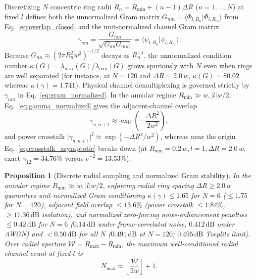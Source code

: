 \documentclass[aps,pra,onecolumn,notitlepage,11pt,tightenlines,amsmath,amssymb,floatfix,longbibliography]{revtex4-2}
\providecommand{\braket}[2]{\langle#1\vert#2\rangle}
\providecommand{\abs}[1]{\lvert#1\rvert}
\newtheorem{proposition}{Proposition}
\begin{document}
Discretizing $N$ concentric ring radii $R_n = R_{\min} + (n-1)\Delta R$ ($n = 1,\dots,N$) at fixed $l$ defines both the unnormalized Gram matrix $G_{nm} = \braket{\Phi_{l,R_n}}{\Phi_{l,R_m}}$ from Eq.~\eqref{eq:overlap_closed} and the unit-normalized channel Gram matrix
\begin{equation}
\gamma_{nm} = \frac{G_{nm}}{\sqrt{G_{nn} G_{mm}}} = \braket{\psi_{l,R_n}}{\psi_{l,R_m}}.
\label{eq:gram_normalized}
\end{equation}
Because $G_{nn} \approx (2\pi R_n^2 w^2)^{-1/2}$ decays as $R_n^{-1}$, the unnormalized condition number $\kappa(G) = \lambda_{\max}(G)/\lambda_{\min}(G)$ grows spuriously with $N$ even when rings are well separated (for instance, at $N = 120$ and $\Delta R = 2.0\,w$, $\kappa(G) = 80.02$ whereas $\kappa(\gamma) = 1.741$). Physical channel demultiplexing is governed strictly by $\gamma_{nm}$ in Eq.~\eqref{eq:gram_normalized}. In the annular regime $R_{\min} \gg w, \abs{l}w/2$, Eq.~\eqref{eq:gamma_normalized} gives the adjacent-channel overlap
\begin{equation}
\gamma_{n,n+1} \approx \exp\!\left(-\frac{\Delta R^2}{2w^2}\right),
\label{eq:crosstalk_asymptotic}
\end{equation}
and power crosstalk $\abs{\gamma_{n,n+1}}^2 \approx \exp(-\Delta R^2/w^2)$, whereas near the origin Eq.~\eqref{eq:crosstalk_asymptotic} breaks down (at $R_{\min} = 0.2\,w, l = 1, \Delta R = 2.0\,w$, exact $\gamma_{12} = 34.76\%$ versus $e^{-2} = 13.53\%$).

\begin{proposition}[Discrete radial sampling and normalized Gram stability]
\label{prop:channel_capacity}
In the annular regime $R_{\min} \gg w, \abs{l}w/2$, enforcing radial ring spacing $\Delta R \ge 2.0\,w$ guarantees unit-normalized Gram conditioning $\kappa(\gamma) \le 1.65$ for $N = 6$ ($\le 1.75$ for $N = 120$), adjacent field overlap $\le 13.6\%$ (power crosstalk $\le 1.84\%$, $\ge 17.36\,\mathrm{dB}$ isolation), and normalized zero-forcing noise-enhancement penalties $\le 0.42\,\mathrm{dB}$ for $N = 6$ ($0.14\,\mathrm{dB}$ under frame-correlated noise, $0.412\,\mathrm{dB}$ under AWGN) and $< 0.50\,\mathrm{dB}$ for all $N$ ($0.491\,\mathrm{dB}$ at $N = 120$; $0.495\,\mathrm{dB}$ Toeplitz limit). Over radial aperture $\mathcal{W} = R_{\max} - R_{\min}$, the maximum well-conditioned radial channel count at fixed $l$ is
\begin{equation}
N_{\max} \approx \left\lfloor \frac{\mathcal{W}}{2w} \right\rfloor + 1.
\label{eq:channel_capacity}
\end{equation}
\end{proposition}
\end{document}
